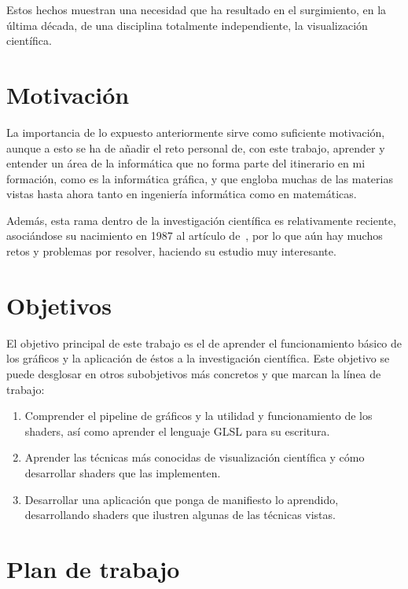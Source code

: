 Estos hechos muestran una necesidad que ha resultado en el surgimiento, en la
última década, de una disciplina totalmente independiente, la visualización
científica. 

\section{Motivación}
\label{makereference1.1}

La importancia de lo expuesto anteriormente sirve como suficiente motivación,
aunque a esto se ha de añadir el reto personal de, con este trabajo, aprender y
entender un área de la informática que no forma parte del itinerario en mi
formación, como es la informática gráfica, y que engloba muchas de las materias
vistas hasta ahora tanto en ingeniería informática como en matemáticas.

Además, esta rama dentro de la investigación científica es relativamente
reciente, asociándose su nacimiento en 1987 al artículo
de~\citet{McCormick:1988:VSC:43965.43966}, por lo que aún hay muchos retos y
problemas por resolver, haciendo su estudio muy interesante.

\section{Objetivos}
\label{makereference1.2}

El objetivo principal de este trabajo es el de aprender el funcionamiento básico
de los gráficos y la aplicación de éstos a la investigación científica.  Este
objetivo se puede desglosar en otros subobjetivos más concretos y que marcan la
línea de trabajo:

\begin{enumerate}
		\item Comprender el pipeline de gráficos y la utilidad y funcionamiento
				de los shaders, así como aprender el lenguaje GLSL para su
				escritura.
		\item Aprender las técnicas más conocidas de visualización científica y
				cómo desarrollar shaders que las implementen.
		\item Desarrollar una aplicación que ponga de manifiesto lo aprendido,
				desarrollando shaders que ilustren algunas de las técnicas
				vistas.
\end{enumerate}

\section{Plan de trabajo}
\label{makereference1.3}

